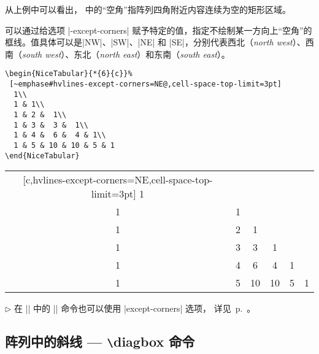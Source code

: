 \documentclass[dvipsnames]{article}%
\begin{document}
从上例中可以看出， 中的“空角”指阵列四角附近内容连续为空的矩形区域。

\bigskip
可以通过给选项 |\hvlines-except-corners| 赋予特定的值，指定不绘制某一方向上“空角”的框线。值具体可以是|NW|、|SW|、|NE| 和 |SE|，分别代表西北（\emph{north west}）、西南（\emph{south west}）、东北（\emph{north east}）和东南（\emph{south east}）。

\bigskip
\begin{BVerbatim}[boxwidth=10.5cm,baseline=c]
\begin{NiceTabular}{*{6}{c}}%
 [~emphase#hvlines-except-corners=NE@,cell-space-top-limit=3pt]
  1\\
  1 & 1\\
  1 & 2 &  1\\
  1 & 3 &  3 &  1\\
  1 & 4 &  6 &  4 & 1\\
  1 & 5 & 10 & 10 & 5 & 1
\end{NiceTabular}
\end{BVerbatim}
\begin{NiceTabular}{*{6}{c}}[c,hvlines-except-corners=NE,cell-space-top-limit=3pt]
1\\
1&1\\
1&2&1\\
1&3&3&1\\
1&4&6&4&1\\
1&5&10&10&5&1
\end{NiceTabular}

\bigskip
$\triangleright$ 在 |\CodeBefore| 中的 |\arraycolor| 命令也可以使用 |except-corners| 选项，
详见~p.~\pageref{arraycolor}。

\subsection{阵列中的斜线 --- \texttt{\textbackslash}diagbox 命令}
\label{zm:斜线}
\end{document}
